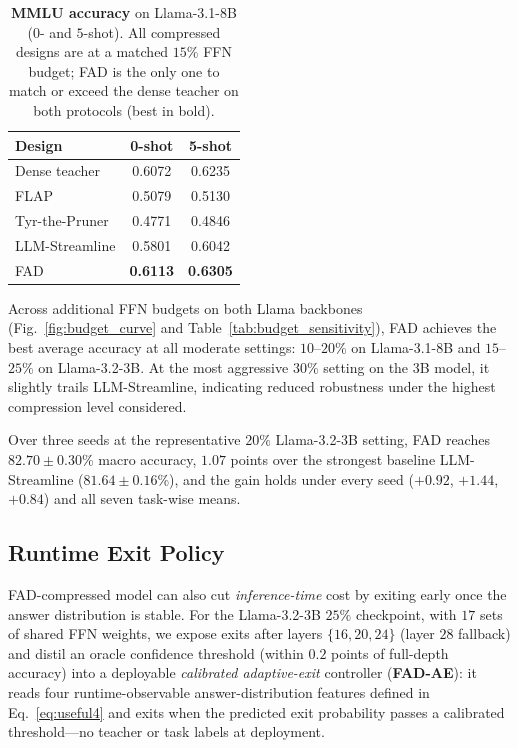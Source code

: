 \documentclass[letterpaper]{article} %
\theoremstyle{plain}
\theoremstyle{definition}
\begin{document}
\begin{table}[t]
\centering\small
\renewcommand{\arraystretch}{0.95}
\setlength{\tabcolsep}{6pt}
\begin{tabular}{@{}l c c@{}}
\toprule
\textbf{Design} & \textbf{0-shot} & \textbf{5-shot}\\
\midrule
Dense teacher & 0.6072 & 0.6235\\
\midrule
FLAP & 0.5079 & 0.5130\\
Tyr-the-Pruner & 0.4771 & 0.4846\\
LLM-Streamline & 0.5801 & 0.6042\\
FAD & \textbf{0.6113} & \textbf{0.6305}\\
\bottomrule
\end{tabular}
\caption{\textbf{MMLU accuracy} on Llama-3.1-8B ($0$- and $5$-shot).
{All compressed designs are at a matched $15\%$ FFN budget; FAD is the only
one to match or exceed the dense teacher on both protocols (best in bold).}}
\label{tab:mmlu}
\end{table}

Across additional FFN budgets on both Llama backbones
(Fig.~\ref{fig:budget_curve} and Table~\ref{tab:budget_sensitivity}), FAD achieves the best average accuracy at all moderate settings: $10$--$20\%$ on Llama-3.1-8B and $15$--$25\%$ on Llama-3.2-3B. At the most aggressive $30\%$ setting on the 3B model, it slightly trails LLM-Streamline, indicating reduced robustness under the highest compression level considered.

Over three seeds at the representative $20\%$ Llama-3.2-3B setting, FAD reaches
$82.70\pm0.30\%$ macro accuracy, $1.07$ points over the strongest baseline
LLM-Streamline ($81.64\pm0.16\%$), and the gain holds under every seed ($+0.92$,
$+1.44$, $+0.84$) and all seven task-wise means.


\subsection{Runtime Exit Policy}
\label{sec:runtime-exit}
FAD-compressed model can also cut \emph{inference-time} cost by exiting
early once the answer distribution is stable. For the Llama-3.2-3B $25\%$
checkpoint, with $17$ sets of shared FFN weights, we expose exits after layers
$\{16,20,24\}$ (layer $28$ fallback) and distil an oracle confidence threshold
(within $0.2$ points of full-depth accuracy) into a deployable \emph{calibrated
adaptive-exit} controller
(\textbf{FAD-AE}): it reads four runtime-observable answer-distribution features defined in Eq.~\ref{eq:useful4} and exits when the predicted exit probability passes a calibrated threshold---no teacher or task labels at deployment.
\end{document}
